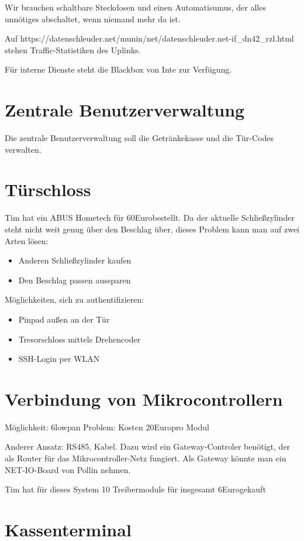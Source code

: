 \documentclass{scrartcl}
\newcommand\euro{Euro}
\newcommand\uc{Mikrocontroller}
\begin{document}
Wir brauchen schaltbare Steckdosen und einen Automatisumus, der alles unnötiges abschaltet, wenn niemand mehr da ist.

Auf https://datenschleuder.net/munin/net/datenschleuder.net-if\_dn42\_rzl.html stehen Traffic-Statistiken des Uplinks.

Für interne Dienste steht die Blackbox von Inte zur Verfügung.

\section{Zentrale Benutzerverwaltung}

Die zentrale Benutzerverwaltung soll die Getränkekasse und die Tür-Codes verwalten.

\section{Türschloss}

Tim hat ein ABUS Hometech für 60\euro bestellt.
Da der aktuelle Schließzylinder steht nicht weit genug über den Beschlag über, dieses Problem kann man auf zwei Arten lösen:
\begin{itemize}
\item{} Anderen Schließzylinder kaufen
\item{} Den Beschlag passen aussparen
\end{itemize}

Möglichkeiten, sich zu authentifizieren:
\begin{itemize}
\item{} Pinpad außen an der Tür
\item{} Tresorschloss mittels Drehencoder
\item{} SSH-Login per WLAN
\end{itemize}

\section{Verbindung von Mikrocontrollern}

Möglichkeit: 6lowpan
Problem: Kosten 20\euro pro Modul

Anderer Ansatz: RS485, Kabel. Dazu wird ein Gateway-Controler benötigt, der als Router für das \uc-Netz fungiert.
Als Gateway könnte man ein NET-IO-Board von Pollin nehmen.

Tim hat für dieses System 10 Treibermodule für insgesamt 6\euro gekauft

\section{Kassenterminal}
\end{document}
